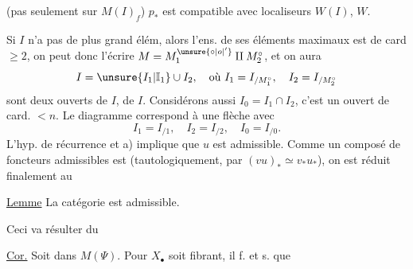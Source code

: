(pas seulement sur $M(I)_f$) $p_*$ est compatible avec localiseurs $W(I)$, $W$.

Si $I$ n'a pas de plus grand élém, alors l'ens.  de ses éléments maximaux est de card $\geq2$, on peut donc l'écrire $M=M_1^{\unsure{\circ|o|'}}\amalg M_2^\circ$, et on aura
\[
I=\unsure{I_1|\mathbb I_1}\cup I_2,\quad\text{où }I_1=I_{/M_1^\circ},\quad I_2=I_{/M_2^\circ}
\]
sont deux ouverts de $I$,  de $I$.  Considérons aussi $I_0=I_1\cap I_2$, c'est un ouvert de card. $<n$. Le diagramme
correspond à une flèche
avec
\[
I_1=I_{/1},\quad I_2=I_{/2},\quad I_0=I_{/0}.
\]
L'hyp. de récurrence et a) implique que $u$ est admissible. Comme un composé de foncteurs admissibles est  (tautologiquement, par $(vu)_*\simeq v_*u_*$), on est réduit finalement au

\uline{Lemme} La catégorie
est admissible.

Ceci va résulter du

\uline{Cor.} Soit
dans $M(\Psi)$. Pour $X_\bullet$ soit fibrant, il f. et s. que

